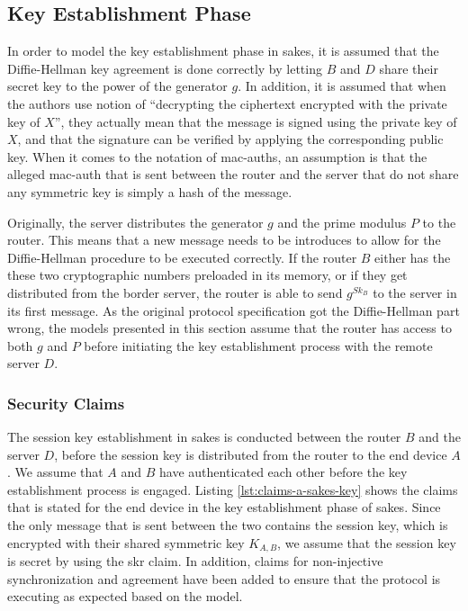 \newpage

\subsection{Key Establishment Phase}

In order to model the key establishment phase in \gls{sakes}, it is assumed that the Diffie-Hellman key agreement is done correctly by letting $B$ and $D$ share their secret key to the power of the generator $g$. In addition, it is assumed that when the authors use notion of ``decrypting the ciphertext encrypted with the private key of $X$'', they actually mean that the message is signed using the private key of $X$, and that the signature can be verified by applying the corresponding public key. When it comes to the notation of \gls{mac-auth}s, an assumption is that the alleged \gls{mac-auth} that is sent between the router and the server that do not share any symmetric key is simply a hash of the message.

Originally, the server distributes the generator $g$ and the prime modulus $P$ to the router. This means that a new message needs to be introduces to allow for the Diffie-Hellman procedure to be executed correctly. If the router $B$ either has the these two cryptographic numbers preloaded in its memory, or if they get distributed from the border server, the router is able to send $g^{Sk_B}$ to the server in its first message. As the original protocol specification got the Diffie-Hellman part wrong, the models presented in this section assume that the router has access to both $g$ and $P$ before initiating the key establishment process with the remote server $D$.


\subsubsection{Security Claims}

The session key establishment in \gls{sakes} is conducted between the router $B$ and the server $D$, before the session key is distributed from the router to the end device $A$. We assume that $A$ and $B$ have authenticated each other before the key establishment process is engaged. Listing \ref{lst:claims-a-sakes-key} shows the claims that is stated for the end device in the key establishment phase of \gls{sakes}. Since the only message that is sent between the two contains the session key, which is encrypted with their shared symmetric key $K_{A,B}$, we assume that the session key is secret by using the \gls{skr} claim. In addition, claims for non-injective synchronization and agreement have been added to ensure that the protocol is executing as expected based on the model.\\

